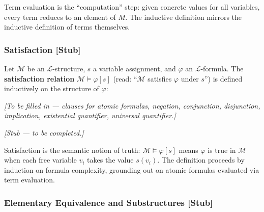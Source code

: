 \begin{remark*}[Intuition]
Term evaluation is the ``computation'' step: given concrete values for
all variables, every term reduces to an element of $M$. The inductive
definition mirrors the inductive definition of terms themselves.
\end{remark*}


\subsubsection*{Satisfaction \textnormal{[Stub]}}

\begin{tcolorbox}[colback=propbox, colframe=propborder, arc=2pt,
  left=6pt, right=6pt, top=4pt, bottom=4pt,
  title={\small\textbf{Definition (Satisfaction, $\mathcal{M} \models \varphi[s]$) --- Stub}},
  fonttitle=\small\bfseries]
\label{def:satisfaction}
Let $\mathcal{M}$ be an $\mathcal{L}$-structure, $s$ a variable assignment,
and $\varphi$ an $\mathcal{L}$-formula.
The \textbf{satisfaction relation} $\mathcal{M} \models \varphi[s]$
(read: ``$\mathcal{M}$ satisfies $\varphi$ under $s$'') is defined
inductively on the structure of $\varphi$:

\medskip
\textit{[To be filled in --- clauses for atomic formulas, negation,
conjunction, disjunction, implication, existential quantifier,
universal quantifier.]}
\end{tcolorbox}

\begin{remark*}
\textit{[Stub --- to be completed.]}
\end{remark*}

\begin{remark*}[Intuition]
Satisfaction is the semantic notion of truth: $\mathcal{M} \models \varphi[s]$
means $\varphi$ is true in $\mathcal{M}$ when each free variable $v_i$ takes
the value $s(v_i)$.
The definition proceeds by induction on formula complexity,
grounding out on atomic formulas evaluated via term evaluation.
\end{remark*}


\subsubsection*{Elementary Equivalence and Substructures \textnormal{[Stub]}}
